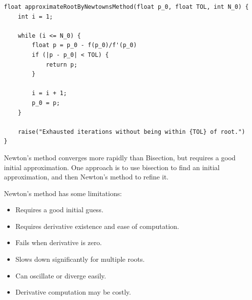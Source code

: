 \documentclass{article}
\begin{document}
\begin{verbatim}
float approximateRootByNewtownsMethod(float p_0, float TOL, int N_0) {
    int i = 1;

    while (i <= N_0) {
        float p = p_0 - f(p_0)/f'(p_0)
        if (|p - p_0| < TOL) {
            return p;
        }

        i = i + 1;
        p_0 = p;
    }
    
    raise("Exhausted iterations without being within {TOL} of root.")
} 
\end{verbatim}

Newton's method \@{converges} more rapidly than Bisection, but requires a good initial approximation. One approach is to use bisection to find an initial approximation, and then Newton's method to refine it.

Newton's method has some limitations:

\begin{itemize}
\item Requires a good initial guess.
\item Requires derivative existence and ease of computation.
\item Fails when derivative is zero.
\item Slows down significantly for multiple roots.
\item Can oscillate or \@{diverge} easily.
\item Derivative computation may be costly.
\end{itemize}
\end{document}
